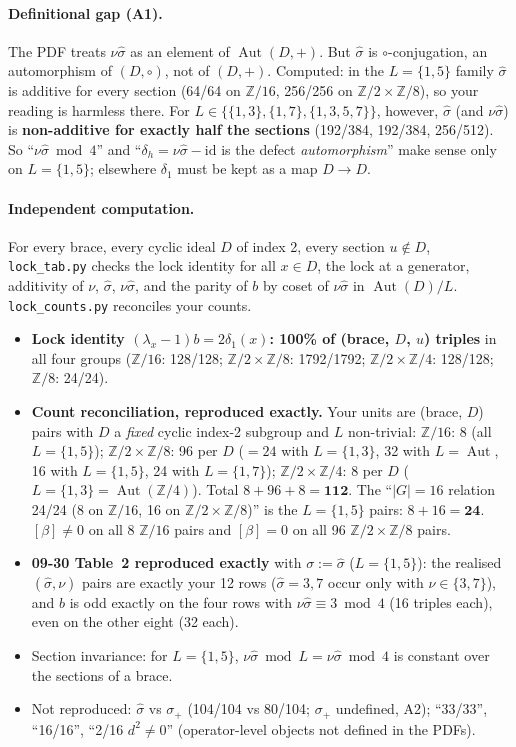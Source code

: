 \documentclass[11pt]{article}
\newcommand{\Z}{\mathbb{Z}}
\newcommand{\Aut}{\operatorname{Aut}}
\newcommand{\sh}{\hat\sigma}
\begin{document}
\paragraph{Definitional gap (A1).} The PDF treats $\nu\sh$ as an element of $\Aut(D,+)$.
But $\sh$ is $\circ$-conjugation, an automorphism of $(D,\circ)$, not of $(D,+)$.
Computed: in the $L=\{1,5\}$ family $\sh$ is additive for every section (64/64 on
$\Z/16$, 256/256 on $\Z/2\times\Z/8$), so your reading is harmless there. For
$L\in\{\{1,3\},\{1,7\},\{1,3,5,7\}\}$, however, $\sh$ (and $\nu\sh$) is
\textbf{non-additive for exactly half the sections} (192/384, 192/384, 256/512). So
``$\nu\sh\bmod4$'' and ``$\delta_h=\nu\sh-\mathrm{id}$ is the defect
\emph{automorphism}'' make sense only on $L=\{1,5\}$; elsewhere $\delta_1$ must be kept
as a map $D\to D$.

\paragraph{Independent computation.} For every brace, every cyclic ideal $D$ of index 2,
every section $u\notin D$, \texttt{lock\_tab.py} checks the lock identity for all
$x\in D$, the lock at a generator, additivity of $\nu$, $\sh$, $\nu\sh$, and the parity
of $b$ by coset of $\nu\sh$ in $\Aut(D)/L$. \texttt{lock\_counts.py} reconciles your counts.
\begin{itemize}[leftmargin=*]
\item \textbf{Lock identity $(\lambda_x-1)b=2\delta_1(x)$: 100\% of (brace, $D$, $u$) triples}
in all four groups ($\Z/16$: 128/128; $\Z/2\times\Z/8$: 1792/1792; $\Z/2\times\Z/4$: 128/128;
$\Z/8$: 24/24).
\item \textbf{Count reconciliation, reproduced exactly.} Your units are (brace, $D$) pairs
with $D$ a \emph{fixed} cyclic index-2 subgroup and $L$ non-trivial: $\Z/16$: 8 (all
$L=\{1,5\}$); $\Z/2\times\Z/8$: 96 per $D$ ($=24$ with $L=\{1,3\}$, 32 with $L=\Aut$, 16
with $L=\{1,5\}$, 24 with $L=\{1,7\}$); $\Z/2\times\Z/4$: 8 per $D$ ($L=\{1,3\}=\Aut(\Z/4)$).
Total $8+96+8=\mathbf{112}$. The ``$|G|=16$ relation 24/24 (8 on $\Z/16$, 16 on
$\Z/2\times\Z/8$)'' is the $L=\{1,5\}$ pairs: $8+16=\mathbf{24}$. $[\beta]\neq0$ on all 8
$\Z/16$ pairs and $[\beta]=0$ on all 96 $\Z/2\times\Z/8$ pairs.
\item \textbf{09-30 Table~2 reproduced exactly} with $\sigma:=\sh$ ($L=\{1,5\}$): the
realised $(\sh,\nu)$ pairs are exactly your 12 rows ($\sh=3,7$ occur only with
$\nu\in\{3,7\}$), and $b$ is odd exactly on the four rows with $\nu\sh\equiv3\bmod4$ (16
triples each), even on the other eight (32 each).
\item Section invariance: for $L=\{1,5\}$, $\nu\sh\bmod L=\nu\sh\bmod4$ is constant over
the sections of a brace.
\item Not reproduced: $\sh$ vs $\sigma_+$ (104/104 vs 80/104; $\sigma_+$ undefined, A2);
``33/33'', ``16/16'', ``2/16 $d^2\neq0$'' (operator-level objects not defined in the PDFs).
\end{itemize}
\end{document}
